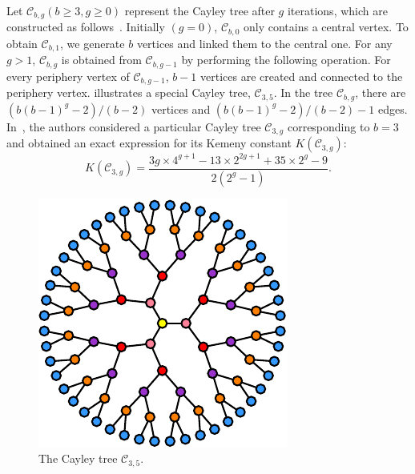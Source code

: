 \documentclass[10pt,twocolumn,twoside]{IEEEtran}
\begin{document}
Let \(\mathcal{C}_{b,g}(b\ge3,g\ge0)\) represent the Cayley tree after
\(g\) iterations, which are constructed  as follows~\cite{CaCh97,ChCa99}. Initially \((g = 0)\), \(\mathcal{C}_{b,0}\) only contains a central vertex. To obtain \(\mathcal{C}_{b,1}\), we generate  \(b\) vertices and linked them to
the central one. For any \(g>1\), \(\mathcal{C}_{b,g}\) is obtained from \(\mathcal{C}_{b,g-1}\) by performing the following operation. For every periphery vertex of \(\mathcal{C}_{b,g-1}\), \(b-1\) vertices are created and connected to
the periphery vertex.  illustrates a special Cayley tree,
\(\mathcal{C}_{3,5}\). In the tree \(\mathcal{C}_{b,g}\), there are \((b(b-1)^g-2)/(b-2)\) vertices and \((b(b-1)^g-2)/(b-2)-1\) edges. In~\cite{JuWuZh13}, the authors  considered a particular Cayley tree \(\mathcal{C}_{3,g}\) corresponding to \(b=3\) and obtained an exact expression for its  Kemeny constant \(K(\mathcal{C}_{3,g})\):
\begin{equation}\label{Kg03}
    K(\mathcal{C}_{3,g})=\frac{3g\times 4^{g+1}-13\times 2^{2g+1} + 35\times 2^g - 9}{2(2^g-1)}.
\end{equation}

\begin{figure}[!t]
    \centering
    \includegraphics[width=0.6\linewidth,trim=0 0 0 0]{Cayley.pdf}
    \caption{The Cayley tree \(\mathcal{C}_{3,5}\).}
    \label{Cayley}
\end{figure}
\end{document}

